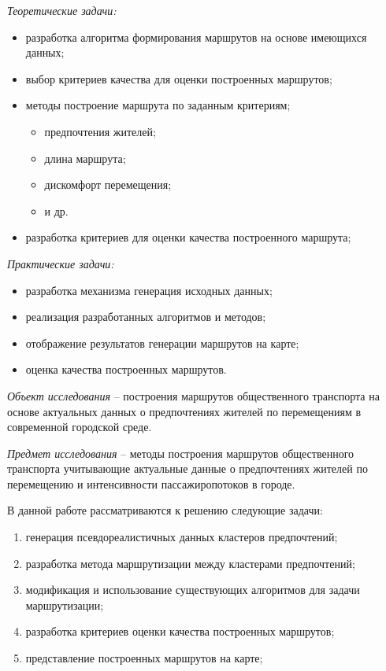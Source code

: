 \emph{Теоретические задачи:}
\vspace*{-1em}
\begin{itemize}\itemsep-5pt
    \item разработка алгоритма формирования маршрутов на основе имеющихся данных;
    \item выбор критериев качества для оценки построенных маршрутов;
    \item методы построение маршрута по заданным критериям;
    \begin{itemize}\itemsep-5pt
        \item предпочтения жителей;
        \item длина маршрута;
        \item дискомфорт перемещения;
        \item и др.
    \end{itemize}
    \item разработка критериев для оценки качества построенного маршрута;
\end{itemize}
\emph{Практические задачи:}
\vspace*{-1em}
\begin{itemize}\itemsep-5pt
    \item разработка механизма генерация исходных данных;
    \item реализация разработанных алгоритмов и методов;
    \item отображение результатов генерации маршрутов на карте;
    \item оценка качества построенных маршрутов.
\end{itemize}

\emph{Объект исследования} -- построения маршрутов общественного транспорта на основе актуальных 
данных о предпочтениях жителей по перемещениям в современной городской среде.

\emph{Предмет исследования} -- методы построения маршрутов общественного транспорта учитывающие 
актуальные данные о предпочтениях жителей по перемещению и интенсивности пассажиропотоков в городе.

В данной работе рассматриваются к решению следующие задачи:
\begin{enumerate}\itemsep-5pt
    \item генерация псевдореалистичных данных кластеров предпочтений;
    \item разработка метода маршрутизации между кластерами предпочтений;
    \item модификация и использование существующих алгоритмов для задачи маршрутизации;
    \item разработка критериев оценки качества построенных маршрутов;
    \item представление построенных маршрутов на карте;
\end{enumerate}

